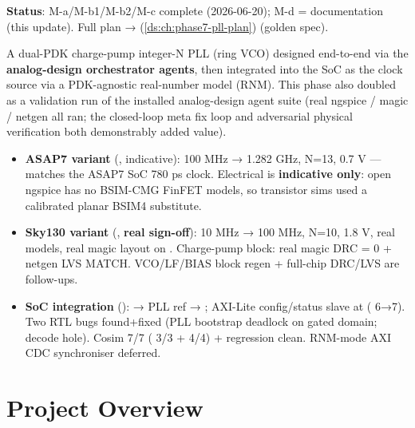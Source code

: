 \begin{record}

\textbf{Status}:
M-a/\allowbreak{}M-b1/\allowbreak{}M-b2/\allowbreak{}M-c complete
(2026-06-20); M-d = documentation (this update). Full plan →
 (\cref{ds:ch:phase7-pll-plan}) (golden spec).

A dual-PDK charge-pump integer-N PLL (ring VCO) designed end-to-end via
the \textbf{analog-design orchestrator agents}, then integrated into the
SoC as the clock source via a PDK-agnostic real-number model (RNM). This
phase also doubled as a validation run of the installed analog-design
agent suite (real ngspice / magic / netgen all ran; the closed-loop meta
fix loop and adversarial physical verification both demonstrably added
value).

\begin{itemize}
\tightlist
\item
  \textbf{ASAP7 variant} (, indicative): 100 MHz
  → 1.282 GHz, N=13, 0.7 V --- matches the ASAP7 SoC 780 ps clock.
  Electrical is \textbf{indicative only}: open ngspice has no BSIM-CMG
  FinFET models, so transistor sims used a calibrated planar BSIM4
  substitute.
\item
  \textbf{Sky130 variant} (, \textbf{real
  sign-off}): 10 MHz → 100 MHz, N=10, 1.8 V, real 
  models, real magic layout on . Charge-pump block:
  real magic DRC = 0 + netgen LVS MATCH.
  VCO/\allowbreak{}LF/\allowbreak{}BIAS block regen + full-chip DRC/LVS
  are follow-ups.
\item
  \textbf{SoC integration} ():  → PLL ref
  → ; AXI-Lite config/\allowbreak{}status slave at
   ( 6→7). Two RTL bugs
  found+fixed (PLL bootstrap deadlock on gated domain;
   decode hole). Cosim 7/7 ( 3/3
  +  4/4) + regression clean. RNM-mode AXI CDC
  synchroniser deferred.
\end{itemize}

\end{record}

\chapter{Project Overview}\label{cr:status:claude-md-overview}

